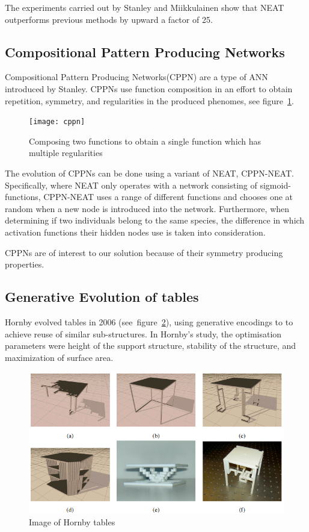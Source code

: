 The experiments carried out by Stanley and Miikkulainen show that NEAT 
outperforms previous methods by upward a factor of 
25\cite[p.~2]{stanley2002evolving}.
\subsection{Compositional Pattern Producing Networks}
\label{sec:cppn}
Compositional Pattern Producing Networks(CPPN) are a type of ANN introduced by 
Stanley\cite{Stanley2007}.
CPPNs use function composition in an effort to obtain repetition, symmetry, and 
regularities in the produced phenomes, see figure~\ref{fig:cppn}.
\begin{figure}[ht]
\centering
\texttt{[image: cppn]}
\caption{Composing two functions to obtain a single function which has multiple 
regularities \cite{Stanley2007}}
\label{fig:cppn}
\end{figure}

The evolution of CPPNs can be done using a variant of NEAT, 
CPPN-NEAT.
Specifically, where NEAT only operates with a network consisting of 
sigmoid-functions, CPPN-NEAT uses a range of different functions and chooses 
one at random when a new node is introduced into the network.
Furthermore, when determining if two individuals belong to the same species, 
the difference in which activation functions their hidden nodes use is taken 
into consideration.

CPPNs are of interest to our solution because of their symmetry producing 
properties.

\subsection{Generative Evolution of tables}
Hornby evolved tables in 2006 (see~figure~\ref{fig:hornby_tables}), using
generative encodings to to achieve reuse of similar sub-structures.
In Hornby's study, the optimisation parameters were height of the support
structure, stability of the structure, and maximization of surface area.
\begin{figure}[ht]
\includegraphics[scale=.6]{content/img/tables}
\caption{Image of Hornby tables\cite{paper:ev4}}
\label{fig:hornby_tables}
\end{figure}

